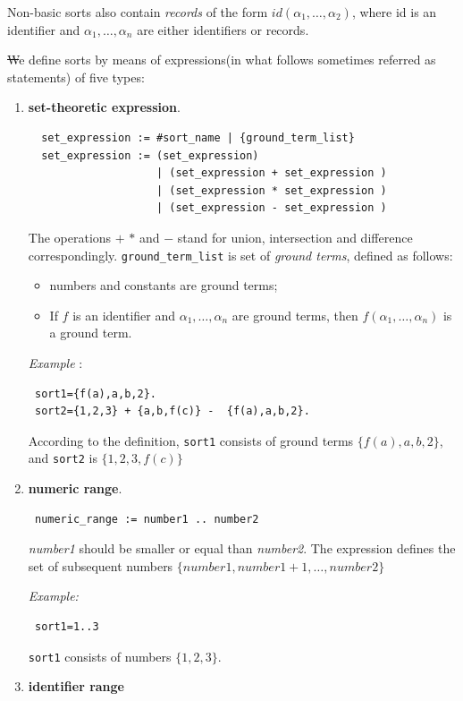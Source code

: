 \documentclass[12pt, letterpaper]{article}
\begin{document}
Non-basic sorts also contain \textit{records} of the form $id(\alpha_1,\dots, \alpha_2)$, where id is an identifier and 
$\alpha_1, \dots, \alpha_n$ are either identifiers or records. 


\st We define sorts by means of expressions(in what follows sometimes referred as statements) of five types:

\begin{enumerate}
 \item \textbf{set-theoretic expression}.
 \begin{verbatim}
  set_expression := #sort_name | {ground_term_list}
  set_expression := (set_expression) 
                    | (set_expression + set_expression ) 
                    | (set_expression * set_expression ) 
                    | (set_expression - set_expression )
  \end{verbatim}
The operations $+$ $*$ and $-$ stand for union, intersection and difference correspondingly.
\texttt{ground\_term\_list} is set of \textit{ground terms}, defined as follows:
\begin{itemize}
 \item numbers and constants are ground terms;
 \item If $f$ is an identifier and $\alpha_1, \dots, \alpha_n$ are ground terms, then $f(\alpha_1,\dots, \alpha_n)$ is a ground term.
\end{itemize}
\textit{Example} : 
\begin{verbatim}
 sort1={f(a),a,b,2}.
 sort2={1,2,3} + {a,b,f(c)} -  {f(a),a,b,2}.
\end{verbatim}
According to the definition, \texttt{sort1} consists of ground terms $\{f(a),a,b,2\}$, and \texttt{sort2} is $\{1,2,3,f(c)\}$ 

\item \textbf{numeric range}.
\begin{verbatim}
 numeric_range := number1 .. number2
\end{verbatim}

\textit{number1} should be smaller or equal than \textit{number2}. The expression defines the set 
of subsequent numbers $\{number1, number1+1, \dots, number2\}$

\textit{Example:}

\begin{verbatim}
 sort1=1..3
\end{verbatim}
\texttt{sort1} consists of numbers $\{1,2,3\}$.


\item \textbf{identifier range}



\end{enumerate}
\end{document}
